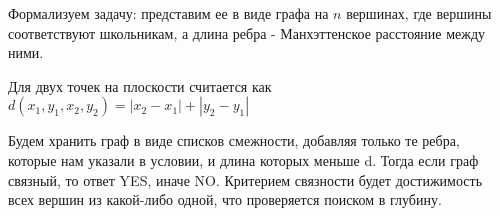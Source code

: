 \solutionSection

Формализуем задачу: представим ее в виде графа на $n$ вершинах, где вершины соответствуют школьникам, а длина ребра - Манхэттенское расстояние между ними.

Для двух точек на плоскости считается как $d(x_1, y_1, x_2, y_2) = |x_2 - x_1| + |y_2 - y_1|$

Будем хранить граф в виде списков смежности, добавляя только те ребра, которые нам указали в условии, и длина которых меньше d. Тогда если граф связный, то ответ YES, иначе NO. Критерием связности будет достижимость всех вершин из какой-либо одной, что проверяется поиском в глубину.

\codeExample

